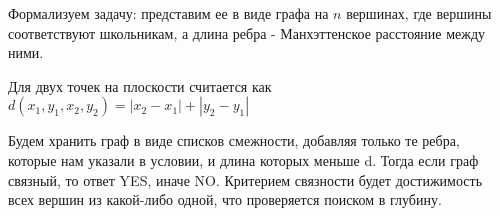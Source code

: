 \solutionSection

Формализуем задачу: представим ее в виде графа на $n$ вершинах, где вершины соответствуют школьникам, а длина ребра - Манхэттенское расстояние между ними.

Для двух точек на плоскости считается как $d(x_1, y_1, x_2, y_2) = |x_2 - x_1| + |y_2 - y_1|$

Будем хранить граф в виде списков смежности, добавляя только те ребра, которые нам указали в условии, и длина которых меньше d. Тогда если граф связный, то ответ YES, иначе NO. Критерием связности будет достижимость всех вершин из какой-либо одной, что проверяется поиском в глубину.

\codeExample

